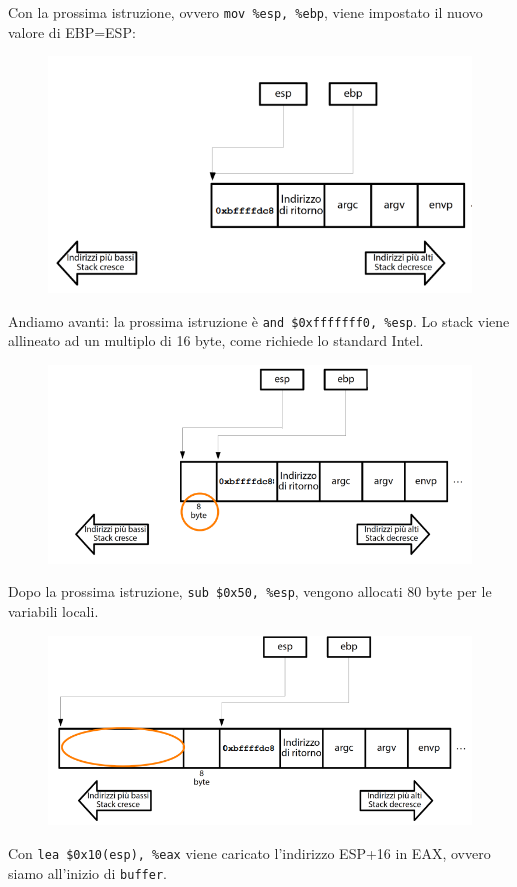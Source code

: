 Con la prossima istruzione, ovvero \texttt{mov \%esp, \%ebp}, viene impostato il nuovo valore di EBP=ESP:

\begin{figure}[hbpt!]
    \centering
    \includegraphics[width= 0.6 \textwidth]{./Images/cap7/7.10.png}
\end{figure}
\FloatBarrier

Andiamo avanti: la prossima istruzione è \texttt{and \$0xfffffff0, \%esp}. Lo stack viene allineato ad un multiplo di 16 byte, come richiede lo standard Intel.

\begin{figure}[hbpt!]
    \centering
    \includegraphics[width= 0.6 \textwidth]{./Images/cap7/7.11.png}
\end{figure}
\FloatBarrier

Dopo la prossima istruzione, \texttt{sub \$0x50, \%esp}, vengono allocati 80 byte per le variabili locali.

\begin{figure}[hbpt!]
    \centering
    \includegraphics[width= 0.6 \textwidth]{./Images/cap7/7.12.png}
\end{figure}
\FloatBarrier

Con \texttt{lea \$0x10(esp), \%eax} viene caricato l'indirizzo ESP+16 in EAX, ovvero siamo all'inizio di \texttt{buffer}.

